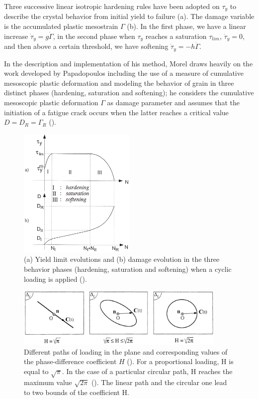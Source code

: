 Three successive linear isotropic hardening rules have
been adopted on $\tau_y$ to describe the crystal behavior from
initial yield to failure (a). The damage variable is the accumulated plastic mesostrain $\Gamma$ (b).
In the first phase, we have a linear increase $\dot{\tau}_y=g\dot{\Gamma}$, in the second phase when $\tau_y$ reaches a saturation $\tau_{lim}$, $\dot{\tau}_y=0$, and then above a certain threshold, we have softening $\dot{\tau}_y=-h\dot{\Gamma}$.

In the description and implementation of his method, Morel draws heavily on the work developed by Papadopoulos including the use of a measure of cumulative mesoscopic plastic deformation   and modeling the behavior of grain in three distinct phases (hardening, saturation and softening); he considers the cumulative mesoscopic plastic deformation $\Gamma$ as damage parameter and assumes that the initiation of a fatigue crack occurs when the latter reaches a
critical value $D = D_R = \Gamma_R$ (). 
\begin{figure}[h!]
	\centering
	\includegraphics[width=0.5\textwidth]{figures//3phases.png} 
	\caption{(a) Yield limit evolutions and (b) damage evolution in the three behavior phases (hardening, saturation and softening) when a cyclic loading is applied (\cite{Morel2000101}).}
	\label{3phases}
\end{figure}

\begin{figure}[h!]
	\centering
	\includegraphics[width=0.9\textwidth]{figures//H.png} 
	\caption{Different paths of loading in the plane and corresponding values of the phase-difference coefficient $H$ (\cite{Morel2000101}). For a proportional loading, H is equal to $\sqrt{\pi}$. In the case of a particular
		circular path, H reaches the maximum value $\sqrt{2\pi}$ (). 
		The linear path and the circular one lead to two bounds of
		the coefficient H.}
	\label{figH}
\end{figure}

